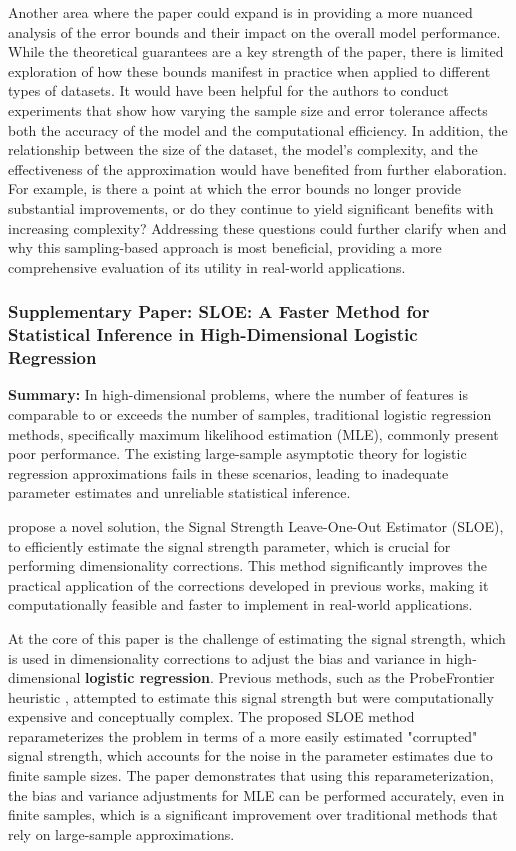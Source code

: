 \documentclass{article}
\theoremstyle{plain}
\theoremstyle{definition}
\theoremstyle{remark}
\begin{document}
Another area where the paper could expand is in providing a more nuanced analysis of the error bounds and their impact on the overall model performance. While the theoretical guarantees are a key strength of the paper, there is limited exploration of how these bounds manifest in practice when applied to different types of datasets. It would have been helpful for the authors to conduct experiments that show how varying the sample size and error tolerance affects both the accuracy of the model and the computational efficiency. In addition, the relationship between the size of the dataset, the model's complexity, and the effectiveness of the approximation would have benefited from further elaboration. For example, is there a point at which the error bounds no longer provide substantial improvements, or do they continue to yield significant benefits with increasing complexity? Addressing these questions could further clarify when and why this sampling-based approach is most beneficial, providing a more comprehensive evaluation of its utility in real-world applications.


\subsubsection{Supplementary Paper: SLOE: A Faster Method for Statistical Inference in High-Dimensional
Logistic Regression \cite{yad21}}

\textbf{Summary:} In high-dimensional problems, where the number of features is comparable to or exceeds the number of samples, traditional logistic regression methods, specifically maximum likelihood estimation (MLE), commonly present poor performance. The existing large-sample asymptotic theory for logistic regression approximations fails in these scenarios, leading to inadequate parameter estimates and unreliable statistical inference.

\citeauthor{yad21} propose a novel solution, the Signal Strength Leave-One-Out Estimator (SLOE), to efficiently estimate the signal strength parameter, which is crucial for performing dimensionality corrections. This method significantly improves the practical application of the corrections developed in previous works, making it computationally feasible and faster to implement in real-world applications.

At the core of this paper is the challenge of estimating the signal strength, which is used in dimensionality corrections to adjust the bias and variance in high-dimensional \textbf{logistic regression}. Previous methods, such as the ProbeFrontier heuristic \cite{sur19}, attempted to estimate this signal strength but were computationally expensive and conceptually complex. The proposed SLOE method reparameterizes the problem in terms of a more easily estimated "corrupted" signal strength, which accounts for the noise in the parameter estimates due to finite sample sizes. The paper demonstrates that using this reparameterization, the bias and variance adjustments for MLE can be performed accurately, even in finite samples, which is a significant improvement over traditional methods that rely on large-sample approximations.
\end{document}
